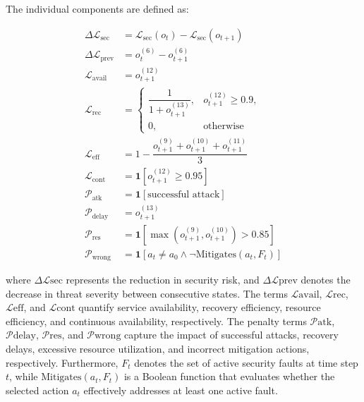 \documentclass[conference,10pt]{IEEEtran}
\begin{document}
The individual components are defined as:

\begin{align}
	\Delta \mathcal{L}_{\mathrm{sec}}
	&=
	\mathcal{L}_{\mathrm{sec}}(o_t)
	-
	\mathcal{L}_{\mathrm{sec}}(o_{t+1})
	\tag{16}
	\\
	\Delta \mathcal{L}_{\mathrm{prev}}
	&=
	o_t^{(6)}
	-
	o_{t+1}^{(6)}
	\tag{17}
	\\
	\mathcal{L}_{\mathrm{avail}}
	&=
	o_{t+1}^{(12)}
	\tag{18}
	\\
	\mathcal{L}_{\mathrm{rec}}
	&=
	\begin{cases}
		\dfrac{1}{1+o_{t+1}^{(13)}},
		& o_{t+1}^{(12)} \ge 0.9,
		\\[2mm]
		0,
		& \text{otherwise}
	\end{cases}
	\tag{19}
	\\
	\mathcal{L}_{\mathrm{eff}}
	&=
	1-\dfrac{
		o_{t+1}^{(9)}
		+
		o_{t+1}^{(10)}
		+
		o_{t+1}^{(11)}
	}{3}
	\tag{20}
	\\
	\mathcal{L}_{\mathrm{cont}}
	&=
	\mathbf{1}
	\!\left[
	o_{t+1}^{(12)} \ge 0.95
	\right]
	\tag{21}
	\\
	\mathcal{P}_{\mathrm{atk}}
	&=
	\mathbf{1}
	\!\left[
	\text{successful attack}
	\right]
	\tag{22}
	\\
	\mathcal{P}_{\mathrm{delay}}
	&=
	o_{t+1}^{(13)}
	\tag{23}
	\\
	\mathcal{P}_{\mathrm{res}}
	&=
	\mathbf{1}
	\!\left[
	\max
	\!\left(
	o_{t+1}^{(9)},
	o_{t+1}^{(10)}
	\right)
	>0.85
	\right]
	\tag{24}
	\\
	\mathcal{P}_{\mathrm{wrong}}
	&=
	\mathbf{1}
	\!\left[
	a_t \neq a_0
	\land
	\neg
	\mathrm{Mitigates}(a_t,F_t)
	\right]
	\tag{25}
\end{align}



where $\Delta \mathcal{L}{\mathrm{sec}}$ represents the reduction in security risk, and $\Delta \mathcal{L}{\mathrm{prev}}$ denotes the decrease in threat severity between consecutive states. The terms $\mathcal{L}{\mathrm{avail}}$, $\mathcal{L}{\mathrm{rec}}$, $\mathcal{L}{\mathrm{eff}}$, and $\mathcal{L}{\mathrm{cont}}$ quantify service availability, recovery efficiency, resource efficiency, and continuous availability, respectively. The penalty terms $\mathcal{P}{\mathrm{atk}}$, $\mathcal{P}{\mathrm{delay}}$, $\mathcal{P}{\mathrm{res}}$, and $\mathcal{P}{\mathrm{wrong}}$ capture the impact of successful attacks, recovery delays, excessive resource utilization, and incorrect mitigation actions, respectively. Furthermore, $F_t$ denotes the set of active security faults at time step $t$, while $\mathrm{Mitigates}(a_t,F_t)$ is a Boolean function that evaluates whether the selected action $a_t$ effectively addresses at least one active fault.
\end{document}
